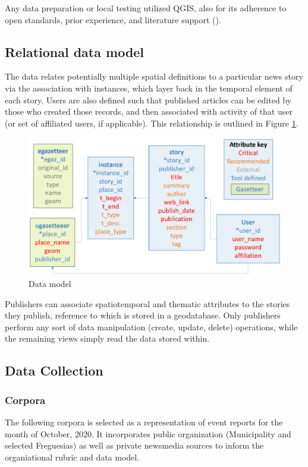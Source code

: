 Any data preparation or local testing utilized QGIS, also for its adherence to open standards, prior experience, and literature support (\cite{Sami2019}).

\subsection{Relational data model}
The data relates potentially multiple spatial definitions to a particular news story via the association with instances, which layer back in the temporal element of each story. Users are also defined such that published articles can be edited by those who created those records, and then associated with activity of that user (or set of affiliated users, if applicable). This relationship is outlined in Figure \ref{fig:data_model}.

\begin{figure}[H]
	\centering
	\includegraphics[width=.9\linewidth]{images/data_model.png}
	\caption{Data model}
	\label{fig:data_model}
\end{figure}

Publishers can associate spatiotemporal and thematic attributes to the stories they publish, reference to which is stored in a geodatabase. Only publishers perform any sort of data manipulation (create, update, delete) operations, while the remaining views simply read the data stored within. 

\subsection{Data Collection}
\subsubsection{Corpora}
The following corpora is selected as a representation of event reports for the month of October, 2020. It incorporates public organization (Municipality and selected Freguesias) as well as private newsmedia sources to inform the organiational rubric and data model.  

